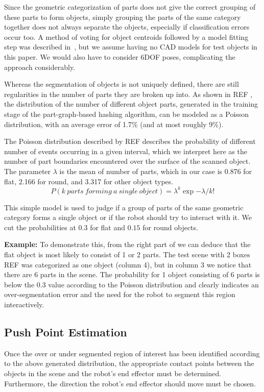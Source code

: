 Since the geometric categorization of parts does not give the correct grouping of these parts to form objects,
simply grouping the parts of the same category together does not always separate the objects, especially if classification errors occur too.
A method of voting for object centroids followed by a model fitting step was described in~\cite{mozos11furniture},
but we assume having no CAD models for test objects in this paper. We would also have to consider 6DOF poses, complicating the approach considerably.

Whereas the segmentation of objects is not uniquely defined, there are still regularities in the number of parts they are broken up into.
As shown in REF%
, the distribution of the number of different object parts, generated in the training stage of the part-graph-based hashing algorithm, can be modeled as a Poisson distribution,
with an average error of 1.7\% (and at most roughly 9\%).


The Poisson distribution described by REF%
describes the probability of different number of events occurring
in a given interval, which we interpret here as the number of part boundaries encountered over the surface of the scanned object.
The parameter $\lambda$ is the mean of number of parts, which in our case is 0.876 for flat, 2.166 for round, and 3.317 for other object types.
\begin{equation}
\label{eq:poisson}
P(k~parts~forming~a~single~object) = \lambda^k \exp{-\lambda} / k!
\end{equation}

This simple model is used to judge if a group of parts of the same geometric category forms a single object or if the robot
should try to interact with it. We cut the probabilities at $0.3$ for flat and $0.15$ for round objects.

\textbf{Example:} To demonstrate this, from the right part of %
we can deduce that the 
flat object is most likely to consist of 1 or 2 parts. The test scene with 
2 boxes REF %
was categorized as one object (column 4), but in column
3 we notice that there are 6 parts in the scene. The probability for 1 object consisting of 6 parts is below the $0.3$ value
according to the Poisson distribution and clearly indicates an over-segmentation 
error and the need for the robot to segment this region interactively.

\subsection{Push Point Estimation}
\label{sec:push-point}
Once the over or under segmented region of interest has been identified 
according to the above generated distribution, the  appropriate contact
points  between the objects in   the   scene  and   the   robot's   end   
effector  must   be determined. Furthermore, the  direction   the robot's  end
effector should move must be chosen.

